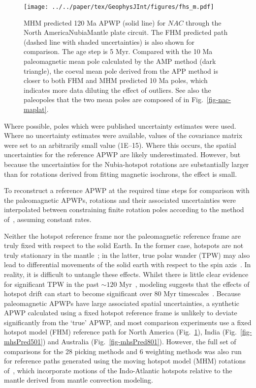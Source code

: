 \begin{figure}[!ht]
\centering
\texttt{[image: ../../paper/tex/GeophysJInt/figures/fhs\_m.pdf]}
\caption[120 Ma MHM vs FHM predicted APWP of North America]{MHM
predicted 120 Ma APWP (solid line) for $NAC$ through the North
America\textendash{}Nubia\textendash{}Mantle plate circuit. The FHM predicted
path (dashed line with shaded uncertainties) is also shown for comparison. The
age step is 5 Myr. Compared with the 10 Ma paleomagnetic mean pole calculated by
the AMP method (dark triangle), the coeval mean pole derived from the APP method
is closer to both FHM and MHM predicted 10 Ma poles, which indicates more data
diluting the effect of outliers. See also the paleopoles that the two mean poles
are composed of in Fig.~\ref{fig-nac-maplat}.}\label{fig-mhsPred}
\end{figure}

Where possible, poles which were published uncertainty estimates were used.
Where no uncertainty estimates were available, values of the covariance matrix
were set to an arbitrarily small value (1E–15). Where this occurs, the spatial
uncertainties for the reference APWP are likely underestimated. However, but
because the uncertainties for the Nubia-hotspot rotations are substantially
larger than for rotations derived from fitting magnetic isochrons, the effect is
small.

To reconstruct a reference APWP at the required time steps for comparison with
the paleomagnetic APWPs, rotations and their associated uncertainties were
interpolated between constraining finite rotation poles according to the method
of~\citet{D08}, assuming constant rates.

Neither the hotspot reference frame nor the paleomagnetic reference frame are
truly fixed with respect to the solid Earth. In the former case, hotspots are
not truly stationary in the mantle~\citep{S98}; in the latter, true polar wander
(TPW) may also lead to differential movements of the solid earth with respect to
the spin axis~\citep{E03}. In reality, it is difficult to untangle these
effects. Whilst there is little clear evidence for significant TPW in the past
${\sim}120$ Myr~\citep{C00,R04}, modeling suggests that the effects of hotspot
drift can start to become significant over 80 Myr
timescales~\citep{O05}. Because paleomagnetic APWPs have large associated
spatial uncertainties, a synthetic APWP calculated using a fixed hotspot
reference frame is unlikely to deviate significantly from the `true' APWP, and
most comparison experiments use a fixed hotspot model (FHM) reference path for
North America (Fig.~\ref{fig-mhsPred}), India (Fig.~\ref{fig-mhsPred501}) and
Australia (Fig.~\ref{fig-mhsPred801}). However, the full set of comparisons for
the 28 picking methods and 6 weighting methods was also run for reference paths
generated using the moving hotspot model (MHM) rotations of~\citet{O05}, which
incorporate motions of the Indo-Atlantic hotspots relative to the mantle derived
from mantle convection modeling.

